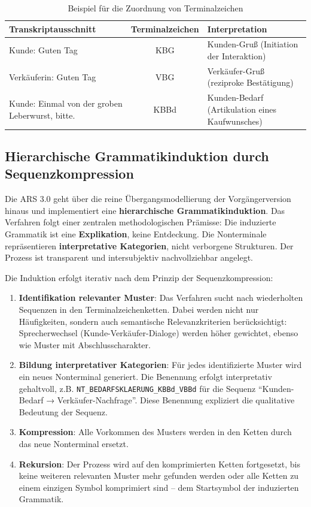 \documentclass[
  12pt,
  a4paper,
  oneside,
  titlepage
]{article}
\begin{document}
\begin{table}[h]
\centering
\caption{Beispiel für die Zuordnung von Terminalzeichen}
\label{tab:terminal}
\begin{tabular}{@{} p{6cm} c p{4cm} @{}}
\toprule
\textbf{Transkriptausschnitt} & \textbf{Terminalzeichen} & \textbf{Interpretation} \\
\midrule
Kunde: Guten Tag & KBG & Kunden-Gruß (Initiation der Interaktion) \\
Verkäuferin: Guten Tag & VBG & Verkäufer-Gruß (reziproke Bestätigung) \\
Kunde: Einmal von der groben Leberwurst, bitte. & KBBd & Kunden-Bedarf (Artikulation eines Kaufwunsches) \\
\bottomrule
\end{tabular}
\end{table}

\subsection{Hierarchische Grammatikinduktion durch Sequenzkompression}

Die ARS 3.0 geht über die reine Übergangsmodellierung der Vorgängerversion hinaus 
und implementiert eine \textbf{hierarchische Grammatikinduktion}. Das Verfahren 
folgt einer zentralen methodologischen Prämisse: Die induzierte Grammatik ist eine 
\textbf{Explikation}, keine Entdeckung. Die Nonterminale repräsentieren 
\textbf{interpretative Kategorien}, nicht verborgene Strukturen. Der Prozess ist 
transparent und intersubjektiv nachvollziehbar angelegt.

Die Induktion erfolgt iterativ nach dem Prinzip der Sequenzkompression:

\begin{enumerate}
    \item \textbf{Identifikation relevanter Muster}: Das Verfahren sucht nach 
    wiederholten Sequenzen in den Terminalzeichenketten. Dabei werden nicht nur 
    Häufigkeiten, sondern auch semantische Relevanzkriterien berücksichtigt: 
    Sprecherwechsel (Kunde-Verkäufer-Dialoge) werden höher gewichtet, ebenso wie 
    Muster mit Abschlusscharakter.
    
    \item \textbf{Bildung interpretativer Kategorien}: Für jedes identifizierte 
    Muster wird ein neues Nonterminal generiert. Die Benennung erfolgt 
    interpretativ gehaltvoll, z.B. \texttt{NT\_BEDARFSKLAERUNG\_KBBd\_VBBd} für 
    die Sequenz \enquote{Kunden-Bedarf → Verkäufer-Nachfrage}. Diese Benennung 
    expliziert die qualitative Bedeutung der Sequenz.
    
    \item \textbf{Kompression}: Alle Vorkommen des Musters werden in den Ketten 
    durch das neue Nonterminal ersetzt.
    
    \item \textbf{Rekursion}: Der Prozess wird auf den komprimierten Ketten 
    fortgesetzt, bis keine weiteren relevanten Muster mehr gefunden werden oder 
    alle Ketten zu einem einzigen Symbol komprimiert sind – dem Startsymbol der 
    induzierten Grammatik.
\end{enumerate}
\end{document}

